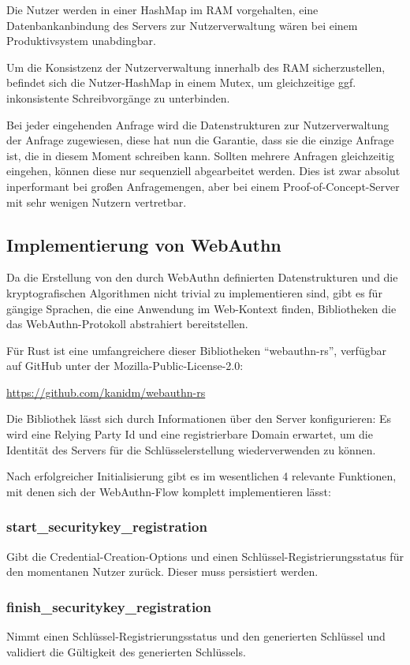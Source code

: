 \documentclass[journal]{IEEEtran}
\begin{document}
Die Nutzer werden in einer HashMap im RAM vorgehalten, eine Datenbankanbindung
des Servers zur Nutzerverwaltung wären bei einem Produktivsystem unabdingbar.

Um die Konsistzenz der Nutzerverwaltung innerhalb des RAM sicherzustellen,
befindet sich die Nutzer-HashMap in einem Mutex, um gleichzeitige ggf.
inkonsistente Schreibvorgänge zu unterbinden.

Bei jeder eingehenden Anfrage wird die Datenstrukturen zur Nutzerverwaltung der
Anfrage zugewiesen, diese hat nun die Garantie, dass sie die einzige Anfrage
ist, die in diesem Moment schreiben kann. Sollten mehrere Anfragen gleichzeitig
eingehen, können diese nur sequenziell abgearbeitet werden. Dies ist zwar
absolut inperformant bei großen Anfragemengen, aber bei einem
Proof-of-Concept-Server mit sehr wenigen Nutzern vertretbar.

\subsection{Implementierung von WebAuthn}

Da die Erstellung von den durch WebAuthn definierten Datenstrukturen und die
kryptografischen Algorithmen nicht trivial zu implementieren sind, gibt es für
gängige Sprachen, die eine Anwendung im Web-Kontext finden, Bibliotheken die
das WebAuthn-Protokoll abstrahiert bereitstellen.

Für Rust ist eine umfangreichere dieser Bibliotheken ``webauthn-rs'',
verfügbar auf GitHub unter der Mozilla-Public-License-2.0:

\url{https://github.com/kanidm/webauthn-rs}

Die Bibliothek lässt sich durch Informationen über den Server konfigurieren:
Es wird eine Relying Party Id und eine registrierbare Domain erwartet, um die
Identität des Servers für die Schlüsselerstellung wiederverwenden zu können.

Nach erfolgreicher Initialisierung gibt es im wesentlichen 4 relevante
Funktionen, mit denen sich der WebAuthn-Flow komplett implementieren lässt:

\subsubsection{start\_securitykey\_registration}
Gibt die Credential-Creation-Options und einen Schlüssel-Registrierungsstatus
für den momentanen Nutzer zurück. Dieser muss persistiert werden.

\subsubsection{finish\_securitykey\_registration}
Nimmt einen Schlüssel-Registrierungsstatus und den generierten Schlüssel und
validiert die Gültigkeit des generierten Schlüssels.
\end{document}
